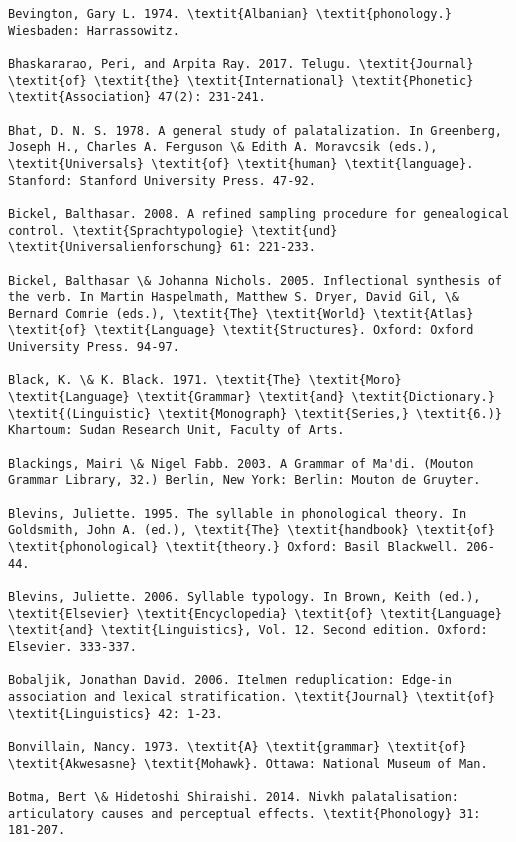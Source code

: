 \begin{verbatim}
Bevington, Gary L. 1974. \textit{Albanian} \textit{phonology.} Wiesbaden: Harrassowitz.

Bhaskararao, Peri, and Arpita Ray. 2017. Telugu. \textit{Journal} \textit{of} \textit{the} \textit{International} \textit{Phonetic} \textit{Association} 47(2): 231-241.

Bhat, D. N. S. 1978. A general study of palatalization. In Greenberg, Joseph H., Charles A. Ferguson \& Edith A. Moravcsik (eds.), \textit{Universals} \textit{of} \textit{human} \textit{language}. Stanford: Stanford University Press. 47-92.

Bickel, Balthasar. 2008. A refined sampling procedure for genealogical control. \textit{Sprachtypologie} \textit{und} \textit{Universalienforschung} 61: 221-233.

Bickel, Balthasar \& Johanna Nichols. 2005. Inflectional synthesis of the verb. In Martin Haspelmath, Matthew S. Dryer, David Gil, \& Bernard Comrie (eds.), \textit{The} \textit{World} \textit{Atlas} \textit{of} \textit{Language} \textit{Structures}. Oxford: Oxford University Press. 94-97.

Black, K. \& K. Black. 1971. \textit{The} \textit{Moro} \textit{Language} \textit{Grammar} \textit{and} \textit{Dictionary.} \textit{(Linguistic} \textit{Monograph} \textit{Series,} \textit{6.)} Khartoum: Sudan Research Unit, Faculty of Arts.

Blackings, Mairi \& Nigel Fabb. 2003. A Grammar of Ma'di. (Mouton Grammar Library, 32.) Berlin, New York: Berlin: Mouton de Gruyter. 

Blevins, Juliette. 1995. The syllable in phonological theory. In Goldsmith, John A. (ed.), \textit{The} \textit{handbook} \textit{of} \textit{phonological} \textit{theory.} Oxford: Basil Blackwell. 206-44.

Blevins, Juliette. 2006. Syllable typology. In Brown, Keith (ed.), \textit{Elsevier} \textit{Encyclopedia} \textit{of} \textit{Language} \textit{and} \textit{Linguistics}, Vol. 12. Second edition. Oxford: Elsevier. 333-337.

Bobaljik, Jonathan David. 2006. Itelmen reduplication: Edge-in association and lexical stratification. \textit{Journal} \textit{of} \textit{Linguistics} 42: 1-23.

Bonvillain, Nancy. 1973. \textit{A} \textit{grammar} \textit{of} \textit{Akwesasne} \textit{Mohawk}. Ottawa: National Museum of Man.

Botma, Bert \& Hidetoshi Shiraishi. 2014. Nivkh palatalisation: articulatory causes and perceptual effects. \textit{Phonology} 31: 181-207.


\end{verbatim}

